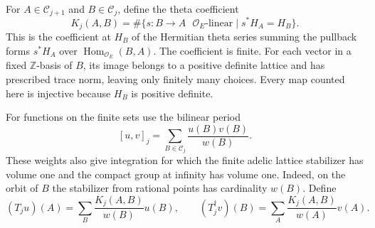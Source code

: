 \documentclass[a4paper,11pt]{article}
\theoremstyle{definition}
\theoremstyle{remark}
\newcommand{\ZZ}{\mathbb Z}\newcommand{\ord}{\operatorname{ord}}
\numberwithin{equation}{section}
\begin{document}
For \(A\in\mathcal C_{j+1}\) and \(B\in\mathcal C_j\), define the theta coefficient
\[
 K_j(A,B)=\#\{s:B\to A\text{ \(\mathcal O_E\)-linear}\mid s^*H_A=H_B\}.
\]
This is the coefficient at \(H_B\) of the Hermitian theta series summing the pullback forms \(s^*H_A\) over \(\operatorname{Hom}_{\mathcal O_E}(B,A)\). The coefficient is finite. For each vector in a fixed \(\ZZ\)-basis of \(B\), its image belongs to a positive definite lattice and has prescribed trace norm, leaving only finitely many choices. Every map counted here is injective because \(H_B\) is positive definite.

For functions on the finite sets use the bilinear period
\[
     [u,v]_j=\sum_{B\in\mathcal C_j}\frac{u(B)v(B)}{w(B)} .
\]
These weights also give integration for which the finite adelic lattice stabilizer has volume one and the compact group at infinity has volume one. Indeed, on the orbit of \(B\) the stabilizer from rational points has cardinality \(w(B)\). Define
\[
 (T_j u)(A)=\sum_B\frac{K_j(A,B)}{w(B)}u(B),
 \qquad (T_j^\dagger v)(B)=\sum_A\frac{K_j(A,B)}{w(A)}v(A).
\]
\end{document}
